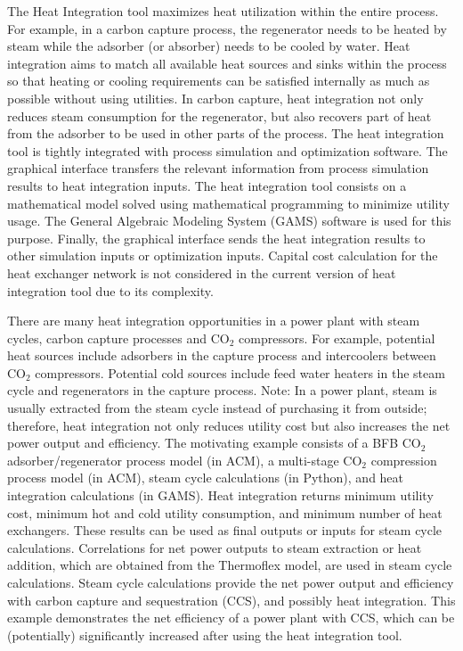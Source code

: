 The Heat Integration tool maximizes heat utilization within the entire process. For example, in a carbon capture process, the regenerator needs to be heated by steam while the adsorber (or absorber) needs to be cooled by water. Heat integration aims to match all available heat sources and sinks within the process so that heating or cooling requirements can be satisfied internally as much as possible without using utilities. In carbon capture, heat integration not only reduces steam consumption for the regenerator, but also recovers part of heat from the adsorber to be used in other parts of the process. The heat integration tool is tightly integrated with process simulation and optimization software. The graphical interface transfers the relevant information from process simulation results to heat integration inputs. The heat integration tool consists on a mathematical model solved using mathematical programming to minimize utility usage. The General Algebraic Modeling System (GAMS) software is used for this purpose. Finally, the graphical interface sends the heat integration results to other simulation inputs or optimization inputs. Capital cost calculation for the heat exchanger network is not considered in the current version of heat integration tool due to its complexity.

There are many heat integration opportunities in a power plant with steam cycles, carbon capture processes and CO$_2$ compressors. For example, potential heat sources include adsorbers in the capture process and intercoolers between CO$_2$ compressors. Potential cold sources include feed water heaters in the steam cycle and regenerators in the capture process. Note: In a power plant, steam is usually extracted from the steam cycle instead of purchasing it from outside; therefore, heat integration not only reduces utility cost but also increases the net power output and efficiency. The motivating example consists of a BFB CO$_2$ adsorber/regenerator process model (in ACM), a multi-stage CO$_2$ compression process model (in ACM), steam cycle calculations (in Python), and heat integration calculations (in GAMS). Heat integration returns minimum utility cost, minimum hot and cold utility consumption, and minimum number of heat exchangers. These results can be used as final outputs or inputs for steam cycle calculations. Correlations for net power outputs to steam extraction or heat addition, which are obtained from the Thermoflex model, are used in steam cycle calculations. Steam cycle calculations provide the net power output and efficiency with carbon capture and sequestration (CCS), and possibly heat integration. This example demonstrates the net efficiency of a power plant with CCS, which can be (potentially) significantly increased after using the heat integration tool.

